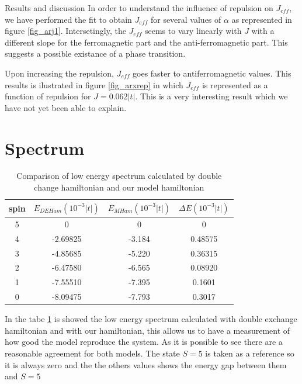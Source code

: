 \documentclass[12pt,twoside]{report}
\begin{document}
\begin{chapter}{Results and discussion}
	In order to understand the influence of repulsion on $J_{eff}$, we have
	performed the fit to obtain $J_{eff}$ for several values of $\alpha$ as
	represented in figure \ref{fig_arj1}. Intersetingly, the $J_{eff}$ seems to
	vary linearly with $J$ with a different slope for the ferromagnetic part and
	the anti-ferromagnetic part. This suggests a possible existance of a phase
	transition.

	Upon increasing the repulsion, $J_{eff}$ goes faster to antiferromagnetic
	values. This results is ilustrated in figure \ref{fig_arxrep} in which
	$J_{eff}$ is represented as a function of repulsion for $J=0.062|t|$. This
	is a very interesting result which we have not yet been able to explain.
   \section{Spectrum}
   
   \begin{table}[H]
   \label{spectrum}
	\caption{Comparison of low energy spectrum calculated by double change hamiltonian and our model hamiltonian }
	\begin{center}
		\begin{tabular}{|c|c|c|c|}
			\hline
			 spin & $E_{DEHam}(10^{-3}|t|)$ & $E_{MHam}(10^{-3}|t|)$ & $\Delta E(10^{-3}|t|)$ \\
			\hline
			5 & 0  & 0  & 0  \\
			\hline
			4 & -2.69825 & -3.184 & 0.48575 \\
			\hline
			3 & -4.85685 & -5.220 & 0.36315 \\
			\hline
			2 & -6.47580 & -6.565 & 0.08920 \\
			\hline
			1 & -7.55510 & -7.395 & 0.1601 \\
			\hline
			0 & -8.09475 & -7.793 & 0.3017  \\
			\hline
		\end{tabular}
	\end{center}
\end{table}
In the tabe \ref{spectrum} is showed the low energy spectrum calculated with double exchange hamiltonian and with our hamiltonian, this allows us to have a measurement of how good the model reproduce the system. As it is possible to see there are a reasonable agreement for both models. The state $S=5$ is taken as a reference so it is always zero and the the others values shows the energy gap between them and $S=5$
	\end{chapter} %
	
\end{document}
